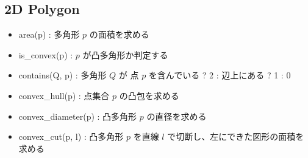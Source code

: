 \subsection{2D Polygon}

\begin{itemize}
	\item area(p) : 多角形 $p$ の面積を求める
	\item is\_convex(p) : $p$ が凸多角形か判定する
	\item contains(Q, p) : 多角形 $Q$ が 点 $p$ を含んでいる ? 2 : 辺上にある ? 1 : 0
	\item convex\_hull(p) : 点集合 $p$ の凸包を求める
	\item convex\_diameter(p) : 凸多角形 $p$ の直径を求める
	\item convex\_cut(p, l) : 凸多角形 $p$ を直線 $l$ で切断し、左にできた図形の面積を求める
\end{itemize}

